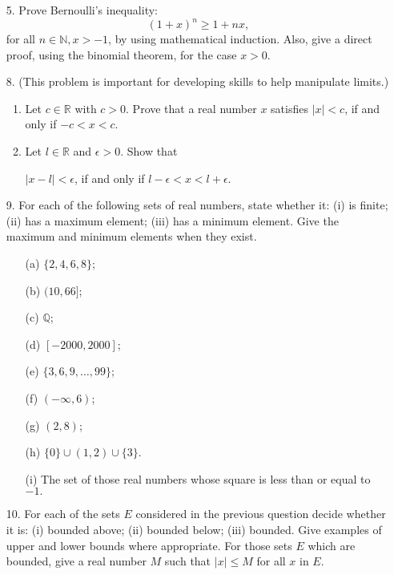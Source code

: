 \documentclass[12pt,a4paper]{article}
\date{}
\newcommand{\R}{\mathbb{R}}
\newcommand{\Q}{\mathbb{Q}}
\newcommand{\nN}{n \in \mathbb{N}}
\begin{document}
\begin{enumerate}




\item[5.] Prove Bernoulli's inequality:
$$ ( 1 + x)^{n} \geq 1 + nx,$$
for all $\nN, x > -1$, by using mathematical induction. Also, give a direct proof, using the binomial theorem, for the case $x > 0$.



\item[8.] (This problem is important for developing skills to help manipulate limits.)
\begin{enumerate}

\item Let $c \in \R$ with $c > 0$. Prove that a real number $x$ satisfies $|x| < c$, if and only if $-c < x < c$.

\item Let $l \in \R$ and $\epsilon > 0$. Show that
\begin{center}
$ |x - l| < \epsilon$, if and only if $l - \epsilon < x < l + \epsilon$.
\end{center}
\end{enumerate}

\item[9.] For each of the following sets of real numbers, state
whether it:  (i) is finite; (ii) has a maximum element; (iii) has
a minimum element.  Give the maximum and minimum elements when they
exist.
\begin{itemize}
\item[(a)] $\{2, 4, 6, 8\}$;
\item[(b)] $(10,66]$;
\item[(c)] $\Q$;
\item[(d)] $[-2000, 2000]$;
\item[(e)] $\{3,6, 9, \dots, 99\}$;
\item[(f)] $(-\infty,6)$;
\item[(g)] $(2, 8)$;
\item[(h)] $\{0\} \cup (1, 2) \cup \{3\}$.
\item[(i)] The set of those real numbers whose square is less than or equal to $-1.$
\end{itemize}

\item[10.]  For each of the sets $E$ considered in the previous
question decide whether it is:  (i) bounded above;  (ii) bounded
below; (iii) bounded. Give examples of upper and lower bounds
where appropriate.  For those sets $E$ which
are bounded, give a real number $M$ such that $|x|\leq M$ for all $x$ in $E$.




\end{enumerate}
\end{document}
